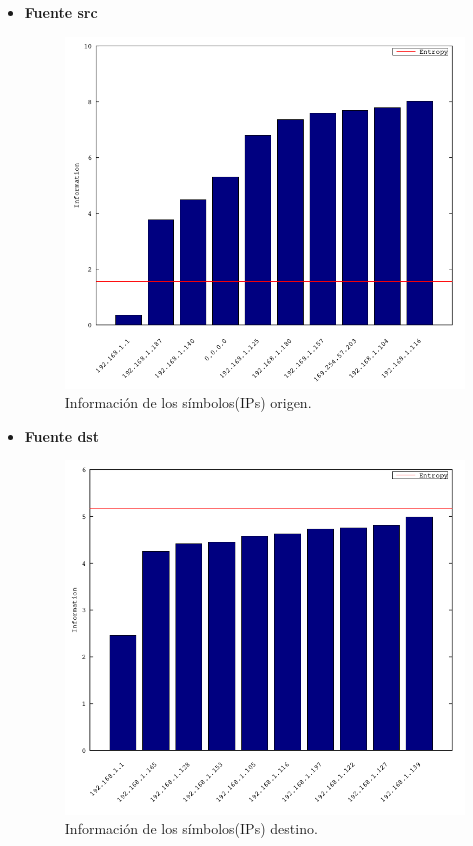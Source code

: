 \documentclass[10pt, a4paper]{article}
\begin{document}
\begin{itemize}

\item \textbf{Fuente src}
\begin{figure}[H] %
\begin{center}
\includegraphics[width=400pt]{../imgs/cecen_src_chartbar.png}
\caption{Información de los símbolos(IPs) origen.}
\end{center}
\end{figure}

\newpage
\item \textbf{Fuente dst}

\begin{figure}[H] %
\begin{center}
\includegraphics[width=400pt]{../imgs/cecen_dst_chartbar.png}
\caption{Información de los símbolos(IPs) destino.}
\end{center}
\end{figure}
\end{itemize}
\end{document}
